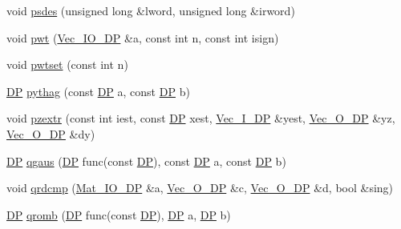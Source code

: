 \begin{DoxyCompactItemize}
\item 
void \mbox{\hyperlink{namespaceNR_a2d127644657046b9b67b8189fd79d51c}{psdes}} (unsigned long \&lword, unsigned long \&irword)
\item 
void \mbox{\hyperlink{namespaceNR_a6e01211469ec1a14c97e90b2bfaa8667}{pwt}} (\mbox{\hyperlink{namespaceNR_ab293e06a6bf799d8a7ed932b6852bcb8}{Vec\+\_\+\+I\+O\+\_\+\+DP}} \&a, const int n, const int isign)
\item 
void \mbox{\hyperlink{namespaceNR_afca49076efe7ccf7bf3d0512ba1c0117}{pwtset}} (const int n)
\item 
\mbox{\hyperlink{namespaceNR_af6ff762dd605ff477b8e52387253a02a}{DP}} \mbox{\hyperlink{namespaceNR_a4794ff6d4eaeeedd85a91698287cd7ac}{pythag}} (const \mbox{\hyperlink{namespaceNR_af6ff762dd605ff477b8e52387253a02a}{DP}} a, const \mbox{\hyperlink{namespaceNR_af6ff762dd605ff477b8e52387253a02a}{DP}} b)
\item 
void \mbox{\hyperlink{namespaceNR_a583932239d9c539ae7d372295b01101a}{pzextr}} (const int iest, const \mbox{\hyperlink{namespaceNR_af6ff762dd605ff477b8e52387253a02a}{DP}} xest, \mbox{\hyperlink{namespaceNR_a9f943da53862537c552e2a770cb170ae}{Vec\+\_\+\+I\+\_\+\+DP}} \&yest, \mbox{\hyperlink{namespaceNR_a970094d23441f8ef6a45282a7eb2103d}{Vec\+\_\+\+O\+\_\+\+DP}} \&yz, \mbox{\hyperlink{namespaceNR_a970094d23441f8ef6a45282a7eb2103d}{Vec\+\_\+\+O\+\_\+\+DP}} \&dy)
\item 
\mbox{\hyperlink{namespaceNR_af6ff762dd605ff477b8e52387253a02a}{DP}} \mbox{\hyperlink{namespaceNR_aea2857e7dfc20dc9c53694f04e7742c6}{qgaus}} (\mbox{\hyperlink{namespaceNR_af6ff762dd605ff477b8e52387253a02a}{DP}} func(const \mbox{\hyperlink{namespaceNR_af6ff762dd605ff477b8e52387253a02a}{DP}}), const \mbox{\hyperlink{namespaceNR_af6ff762dd605ff477b8e52387253a02a}{DP}} a, const \mbox{\hyperlink{namespaceNR_af6ff762dd605ff477b8e52387253a02a}{DP}} b)
\item 
void \mbox{\hyperlink{namespaceNR_a4bfa0581b100fdc8f3bb1a5b8236e084}{qrdcmp}} (\mbox{\hyperlink{namespaceNR_ad1513aa4697878ed3bff0b8b3c9dd910}{Mat\+\_\+\+I\+O\+\_\+\+DP}} \&a, \mbox{\hyperlink{namespaceNR_a970094d23441f8ef6a45282a7eb2103d}{Vec\+\_\+\+O\+\_\+\+DP}} \&c, \mbox{\hyperlink{namespaceNR_a970094d23441f8ef6a45282a7eb2103d}{Vec\+\_\+\+O\+\_\+\+DP}} \&d, bool \&sing)
\item 
\mbox{\hyperlink{namespaceNR_af6ff762dd605ff477b8e52387253a02a}{DP}} \mbox{\hyperlink{namespaceNR_a1d9dac2ce9ca89306257ab81b44473da}{qromb}} (\mbox{\hyperlink{namespaceNR_af6ff762dd605ff477b8e52387253a02a}{DP}} func(const \mbox{\hyperlink{namespaceNR_af6ff762dd605ff477b8e52387253a02a}{DP}}), \mbox{\hyperlink{namespaceNR_af6ff762dd605ff477b8e52387253a02a}{DP}} a, \mbox{\hyperlink{namespaceNR_af6ff762dd605ff477b8e52387253a02a}{DP}} b)

\end{DoxyCompactItemize}
